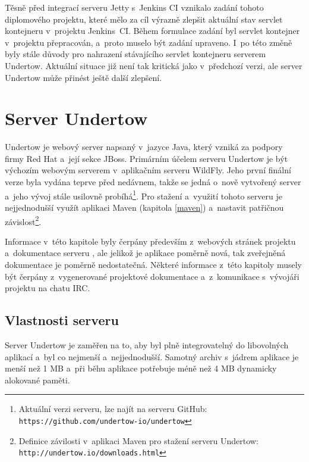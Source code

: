         
        \medskip
        Těsně před integrací serveru Jetty s~Jenkins CI
        vznikalo zadání tohoto diplomového projektu, které mělo za cíl
        výrazně zlepšit aktuální stav servlet kontejneru v~projektu Jenkins~CI. Během
        formulace zadání byl servlet kontejner v~projektu přepracován, a~proto
        muselo být zadání upraveno. I~po této změně byly stále důvody pro 
        nahrazení stávajícího servlet kontejneru serverem Undertow.
        Aktuální situace již není tak kritická jako v~předchozí verzi,
        ale server Undertow může přinést ještě další zlepšení.
                

    \section{Server Undertow} \label{undertow}
        Undertow je webový server napsaný v~jazyce Java, 
        který vzniká za podpory firmy Red Hat a~její sekce JBoss.
        Primárním účelem serveru Undertow je být výchozím webovým serverem v~aplikačním serveru WildFly.
        Jeho první finální verze byla vydána teprve před nedávnem, takže se jedná
        o~nově vytvořený server a~jeho vývoj stále usilovně 
        probíhá\footnote{Aktuální verzi serveru, lze najít na serveru GitHub: 
        \texttt{https://github.com/undertow-io/undertow}}. Pro stažení a~využití tohoto serveru
        je nejjednodušší využít aplikaci Maven (kapitola \ref{maven}) a~nastavit patřičnou 
        závislost\footnote{Definice závilosti v~aplikaci Maven pro stažení serveru Undertow: 
        \texttt{http://undertow.io/downloads.html} }.

        Informace v~této kapitole byly čerpány především z~webových stránek projektu \cite{undertowWeb}
        a~dokumentace serveru \cite{undertowDocs},
        ale jelikož je aplikace poměrně nová, tak zveřejněná dokumentace je poměrně nedostatečná. 
        Některé informace z~této kapitoly musely být čerpány
        z~vygenerované projektové dokumentace a~z~komunikace s~vývojáři projektu
        na chatu IRC.

        \subsection{Vlastnosti serveru}
            Server Undertow je zaměřen na to, aby byl plně integrovatelný do libovolných aplikací
            a~byl co nejmenší a~nejjednodušší. Samotný
            archiv s~jádrem aplikace je menší než 1 MB a~při běhu aplikace potřebuje
            méně než 4 MB dynamicky alokované paměti. 

